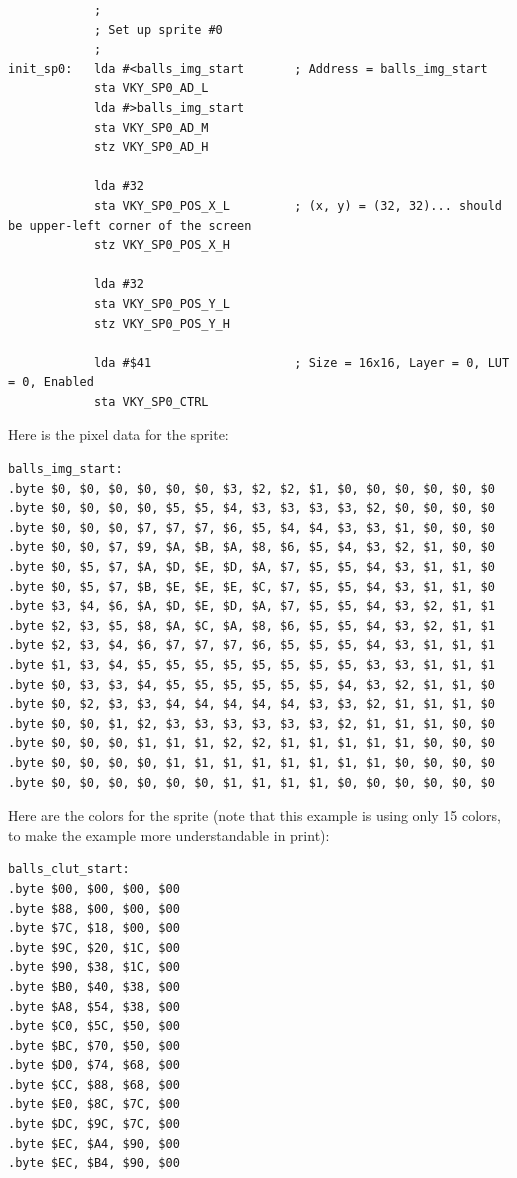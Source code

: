 \begin{verbatim}
            ;
            ; Set up sprite #0
            ;
init_sp0:   lda #<balls_img_start       ; Address = balls_img_start
            sta VKY_SP0_AD_L
            lda #>balls_img_start
            sta VKY_SP0_AD_M
            stz VKY_SP0_AD_H

            lda #32
            sta VKY_SP0_POS_X_L         ; (x, y) = (32, 32)... should be upper-left corner of the screen
            stz VKY_SP0_POS_X_H

            lda #32
            sta VKY_SP0_POS_Y_L
            stz VKY_SP0_POS_Y_H

            lda #$41                    ; Size = 16x16, Layer = 0, LUT = 0, Enabled
            sta VKY_SP0_CTRL
\end{verbatim}

Here is the pixel data for the sprite:
\begin{verbatim}
balls_img_start:
.byte $0, $0, $0, $0, $0, $0, $3, $2, $2, $1, $0, $0, $0, $0, $0, $0
.byte $0, $0, $0, $0, $5, $5, $4, $3, $3, $3, $3, $2, $0, $0, $0, $0
.byte $0, $0, $0, $7, $7, $7, $6, $5, $4, $4, $3, $3, $1, $0, $0, $0
.byte $0, $0, $7, $9, $A, $B, $A, $8, $6, $5, $4, $3, $2, $1, $0, $0
.byte $0, $5, $7, $A, $D, $E, $D, $A, $7, $5, $5, $4, $3, $1, $1, $0
.byte $0, $5, $7, $B, $E, $E, $E, $C, $7, $5, $5, $4, $3, $1, $1, $0
.byte $3, $4, $6, $A, $D, $E, $D, $A, $7, $5, $5, $4, $3, $2, $1, $1
.byte $2, $3, $5, $8, $A, $C, $A, $8, $6, $5, $5, $4, $3, $2, $1, $1
.byte $2, $3, $4, $6, $7, $7, $7, $6, $5, $5, $5, $4, $3, $1, $1, $1
.byte $1, $3, $4, $5, $5, $5, $5, $5, $5, $5, $5, $3, $3, $1, $1, $1
.byte $0, $3, $3, $4, $5, $5, $5, $5, $5, $5, $4, $3, $2, $1, $1, $0
.byte $0, $2, $3, $3, $4, $4, $4, $4, $4, $3, $3, $2, $1, $1, $1, $0
.byte $0, $0, $1, $2, $3, $3, $3, $3, $3, $3, $2, $1, $1, $1, $0, $0
.byte $0, $0, $0, $1, $1, $1, $2, $2, $1, $1, $1, $1, $1, $0, $0, $0
.byte $0, $0, $0, $0, $1, $1, $1, $1, $1, $1, $1, $1, $0, $0, $0, $0
.byte $0, $0, $0, $0, $0, $0, $1, $1, $1, $1, $0, $0, $0, $0, $0, $0
\end{verbatim}

Here are the colors for the sprite (note that this example is using only 15 colors, to make the example more understandable in print):
\begin{verbatim}
balls_clut_start:
.byte $00, $00, $00, $00
.byte $88, $00, $00, $00
.byte $7C, $18, $00, $00
.byte $9C, $20, $1C, $00
.byte $90, $38, $1C, $00
.byte $B0, $40, $38, $00
.byte $A8, $54, $38, $00
.byte $C0, $5C, $50, $00
.byte $BC, $70, $50, $00
.byte $D0, $74, $68, $00
.byte $CC, $88, $68, $00
.byte $E0, $8C, $7C, $00
.byte $DC, $9C, $7C, $00
.byte $EC, $A4, $90, $00
.byte $EC, $B4, $90, $00
\end{verbatim}
